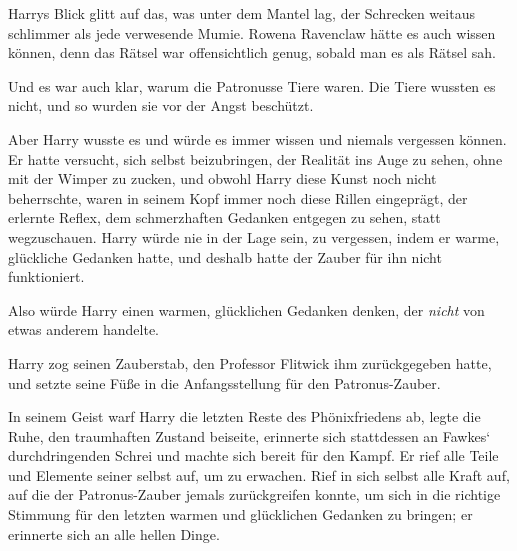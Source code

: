 Harrys Blick glitt auf das, was unter dem Mantel lag, der Schrecken weitaus schlimmer als jede verwesende Mumie. Rowena Ravenclaw hätte es auch wissen können, denn das Rätsel war offensichtlich genug, sobald man es als Rätsel sah.

Und es war auch klar, warum die Patronusse Tiere waren. Die Tiere wussten es nicht, und so wurden sie vor der Angst beschützt.

Aber Harry wusste es und würde es immer wissen und niemals vergessen können. Er hatte versucht, sich selbst beizubringen, der Realität ins Auge zu sehen, ohne mit der Wimper zu zucken, und obwohl Harry diese Kunst noch nicht beherrschte, waren in seinem Kopf immer noch diese Rillen eingeprägt, der erlernte Reflex, dem schmerzhaften Gedanken entgegen zu sehen, statt wegzuschauen. Harry würde nie in der Lage sein, zu vergessen, indem er warme, glückliche Gedanken hatte, und deshalb hatte der Zauber für ihn nicht funktioniert.

Also würde Harry einen warmen, glücklichen Gedanken denken, der \emph{nicht} von etwas anderem handelte.

Harry zog seinen Zauberstab, den Professor Flitwick ihm zurückgegeben hatte, und setzte seine Füße in die Anfangsstellung für den Patronus-Zauber.

In seinem Geist warf Harry die letzten Reste des Phönixfriedens ab, legte die Ruhe, den traumhaften Zustand beiseite, erinnerte sich stattdessen an Fawkes‘ durchdringenden Schrei und machte sich bereit für den Kampf. Er rief alle Teile und Elemente seiner selbst auf, um zu erwachen. Rief in sich selbst alle Kraft auf, auf die der Patronus-Zauber jemals zurückgreifen konnte, um sich in die richtige Stimmung für den letzten warmen und glücklichen Gedanken zu bringen; er erinnerte sich an alle hellen Dinge.

